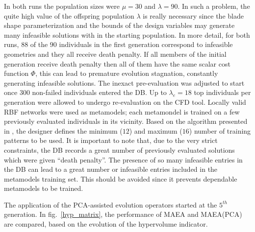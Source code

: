 In both runs the  population sizes were $\mu\!=\!30$ and $\lambda\!=\!90$. In such a problem, the quite high value of the offspring population $\lambda$ is really necessary since the blade shape parameterization and the bounds of the design variables may generate many infeasible solutions  with in the starting population. In more detail, for both runs, $88$ of the $90$ individuals in the first generation correspond to infeasible geometries and they all receive death penalty. If all members of the initial generation receive death penalty then all of them have the same scalar cost function $\Phi$, this can lead to premature evolution stagnation, constantly generating infeasible solutions. The inexact pre-evaluation was adjusted to start once $300$ non-failed individuals entered the DB. Up to $\lambda_e\!=\!18$ top individuals per generation were allowed to undergo re-evaluation on the CFD tool. Locally valid RBF networks were used as metamodels; each metamondel is trained on a few previously evaluated individuals in its vicinity. Based on the algorithm presented in \cite{LTT_2_029}, the designer defines the minimum ($12$) and maximum ($16$) number of training patterns to be used. It is important to note that, due to the very strict constraints, the DB records a great number of previously evaluated solutions which were given ``death penalty''. The presence of so many infeasible entries in the DB can lead to a great number or infeasible entries included in the metamodels training set. This should be avoided since it prevents dependable metamodels to be trained.

The application of the PCA-assisted evolution operators started at the $5^{th}$ generation. In fig.~\ref{hyp_matrix}, the performance of MAEA and MAEA(PCA) are compared, based on the evolution of the hypervolume indicator.


